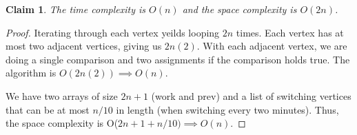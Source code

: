 \documentclass[11pt]{article}
\newtheorem{claim}[theorem]{Claim}
\begin{document}
	\begin{claim}
		The time complexity is $O(n)$ and the space complexity is $O(2n)$.
	\end{claim}

	\begin{proof}
		Iterating through each vertex yeilds looping $2n$ times. Each vertex has at most two adjacent vertices, giving us $2n(2)$. With each adjacent vertex, we are doing a single comparison and two assignments if the comparison holds true. The algorithm is $O(2n(2)) \implies O(n)$.

		We have two arrays of size $2n+1$ (work and prev) and a list of switching vertices that can be at most $n/10$ in length (when switching every two minutes). Thus, the space complexity is O($2n+1+n/10) \implies O(n)$.
	\end{proof}

	\newpage
\end{document}
